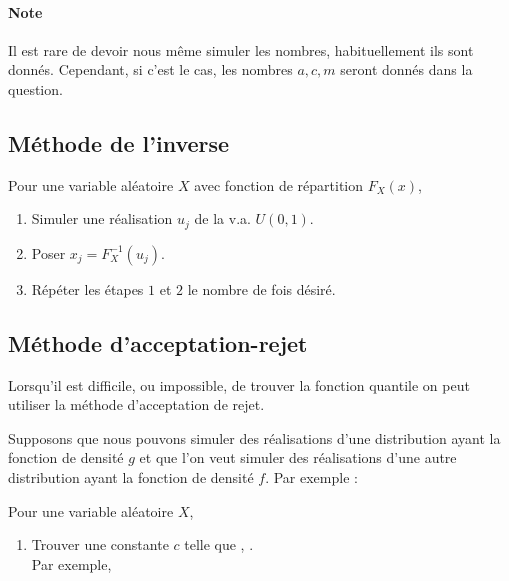 \documentclass[french]{article}
\begin{document}
\begin{multicols*}{2}
\begin{algo2}
\paragraph{Note}	Il est rare de devoir nous même simuler les nombres, habituellement ils sont donnés. Cependant, si c'est le cas, les nombres $a, c, m$ seront donnés dans la question.
\end{algo2}


\subsection{Méthode de l'inverse}
\begin{algo2}
Pour une variable aléatoire $X$ avec fonction de répartition $F_{X}(x)$, 
\begin{enumerate}[label = \circled{\arabic*}{trueblue}]
	\item	Simuler une réalisation $u_{j}$ de la v.a. $U(0, 1)$.
	\item	Poser $x_{j} = F_{X}^{-1}(u_{j})$.
	\item	Répéter les étapes $1$ et $2$ le nombre de fois désiré.
\end{enumerate}
\end{algo2}


\subsection{Méthode d'acceptation-rejet}
\begin{rappel_enhanced}[Contexte]
Lorsqu'il est difficile, ou impossible, de trouver la fonction quantile on peut utiliser la méthode d'acceptation de rejet.
\end{rappel_enhanced}

Supposons que nous pouvons simuler des réalisations d'une distribution ayant la fonction de densité $g$ et que l'on veut simuler des réalisations d'une autre distribution ayant la fonction de densité $f$. 
Par exemple : 

\begin{algo2}
Pour une variable aléatoire $X$, 
\begin{enumerate}[label = \circled{\arabic*}{trueblue}]
	\item	Trouver une constante $c$ telle que , .\\
		Par exemple, 
		\begin{center}
\begin{tikzpicture}[x=0.75pt,y=0.75pt,yscale=-1,xscale=1]


\end{tikzpicture}
\end{center}
\end{enumerate}
\end{algo2}
\end{multicols*}
\end{document}
